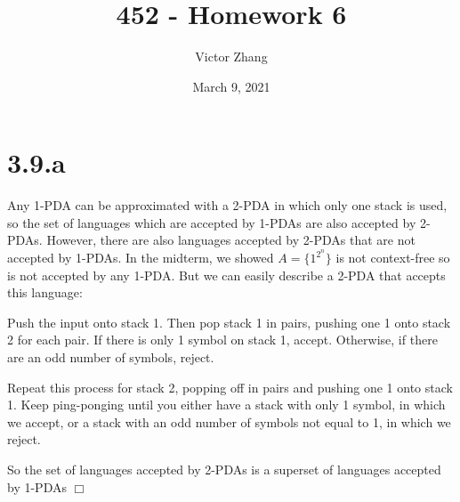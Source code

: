 \documentclass{article}
\title{452 - Homework 6}
\author{Victor Zhang}
\date{March 9, 2021}
\newenvironment{myindentpar}[1]
  {\begin{list}{}
          {\setlength{\leftmargin}{#1}\setlength{\rightmargin}{#1}}
          \item[]
  }
  {\end{list}}
\begin{document}
\maketitle

\section*{3.9.a}
Any 1-PDA can be approximated with a 2-PDA in which only one stack is used, so the set of languages which are accepted by 1-PDAs are also accepted by 2-PDAs. However, there are also languages accepted by 2-PDAs that are not accepted by 1-PDAs. In the midterm, we showed $A = \{1^{2^n}\}$ is not context-free so is not accepted by any 1-PDA. But we can easily describe a 2-PDA that accepts this language:
\begin{myindentpar}{1em}
  Push the input onto stack 1. Then pop stack 1 in pairs, pushing one 1 onto stack 2 for each pair. If there is only 1 symbol on stack 1, accept. Otherwise, if there are an odd number of symbols, reject.

  Repeat this process for stack 2, popping off in pairs and pushing one 1 onto stack 1. Keep ping-ponging until you either have a stack with only 1 symbol, in which we accept, or a stack with an odd number of symbols not equal to 1, in which we reject.
\end{myindentpar}
So the set of languages accepted by 2-PDAs is a superset of languages accepted by 1-PDAs $\Box$
\end{document}
